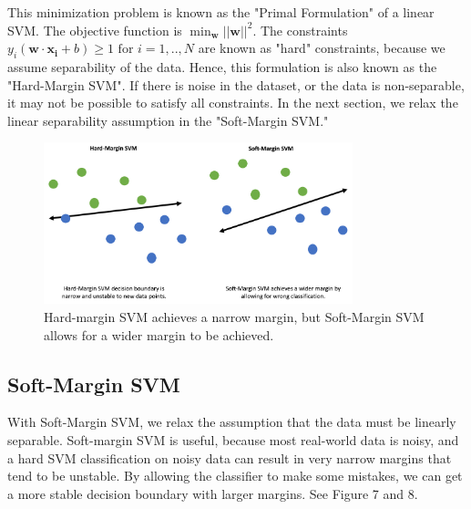 \documentclass[11pt]{article}
\begin{document}
This minimization problem is known as the "Primal Formulation" of a linear SVM. The objective function is $\min_{\mathbf{w}}  ||\mathbf{w}||^2$. The constraints $y_i(\mathbf{w} \cdot \mathbf{x_{i}} +b) \geq 1 \text{ for } i = 1, .., N$ are known as "hard" constraints, because we assume separability of the data. Hence, this formulation is also known as the "Hard-Margin SVM". If there is noise in the dataset, or the data is non-separable, it may not be possible to satisfy all constraints. In the next section, we relax the linear separability assumption in the "Soft-Margin SVM."



\begin{figure}[H]
    \centering
    \includegraphics[width=0.8\textwidth]{images/hardsoft.png}
    \caption{Hard-margin SVM achieves a narrow margin, but Soft-Margin SVM allows for a wider margin to be achieved.}
    \label{fig:hard_v_soft}
\end{figure}

\subsection{Soft-Margin SVM}
With Soft-Margin SVM, we relax the assumption that the data must be linearly separable. Soft-margin SVM is useful, because most real-world data is noisy, and a hard SVM classification on noisy data can result in very narrow margins that tend to be unstable. By allowing the classifier to make some mistakes, we can get a more stable decision boundary with larger margins. See Figure 7 and 8.
\end{document}
